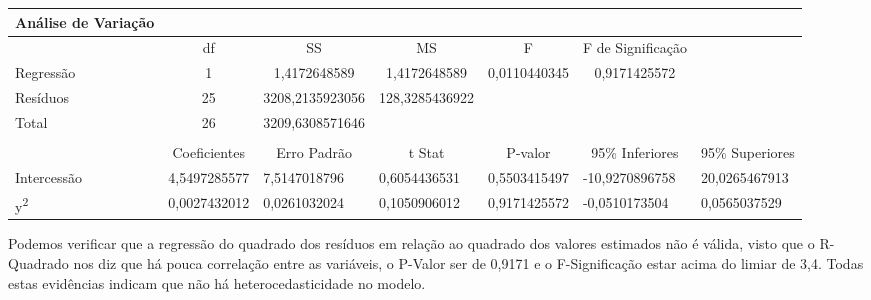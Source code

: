 \begin{table}[h]
{\begin{tabular}{|l|l|l|l|l|l|l|}
Análise de Variação       &                                   &                                      &                                     &                                   &                                        &                                      \\ \hline
                          & \multicolumn{1}{c|}{df}           & \multicolumn{1}{c|}{SS}              & \multicolumn{1}{c|}{MS}             & \multicolumn{1}{c|}{F}            & \multicolumn{1}{c|}{F de Significação} &                                      \\ \hline
Regressão                 & \multicolumn{1}{c|}{1}            & \multicolumn{1}{c|}{1,4172648589}    & \multicolumn{1}{c|}{1,4172648589}   & \multicolumn{1}{c|}{0,0110440345} & \multicolumn{1}{c|}{0,9171425572}      &                                      \\ \hline
Resíduos                  & \multicolumn{1}{c|}{25}           & \multicolumn{1}{c|}{3208,2135923056} & \multicolumn{1}{c|}{128,3285436922} & \multicolumn{1}{c|}{}             & \multicolumn{1}{c|}{}                  &                                      \\ \hline
Total                     & \multicolumn{1}{c|}{26}           & \multicolumn{1}{c|}{3209,6308571646} & \multicolumn{1}{c|}{}               & \multicolumn{1}{c|}{}             & \multicolumn{1}{c|}{}                  &                                      \\ \hline
                          &                                   &                                      &                                     &                                   &                                        &                                      \\ \hline
                          & \multicolumn{1}{c|}{Coeficientes} & \multicolumn{1}{c|}{Erro Padrão}     & \multicolumn{1}{c|}{t Stat}         & \multicolumn{1}{c|}{P-valor}      & \multicolumn{1}{c|}{95\% Inferiores}   & \multicolumn{1}{c|}{95\% Superiores} \\ \hline
Intercessão               & 4,5497285577                      & 7,5147018796                         & 0,6054436531                        & 0,5503415497                      & -10,9270896758                         & 20,0265467913                        \\ \hline
y\textsuperscript{2}      & 0,0027432012                      & 0,0261032024                         & 0,1050906012                        & 0,9171425572                      & -0,0510173504                          & 0,0565037529                         \\ \hline
\end{tabular}%
}
\end{table}
Podemos verificar que a regressão do quadrado dos resíduos em relação ao quadrado dos valores estimados não é válida, visto que o R-Quadrado nos diz que há pouca
correlação entre as variáveis, o P-Valor ser de 0,9171 e o F-Significação estar acima do limiar de 3,4. Todas estas evidências indicam que não há heterocedasticidade no modelo.

